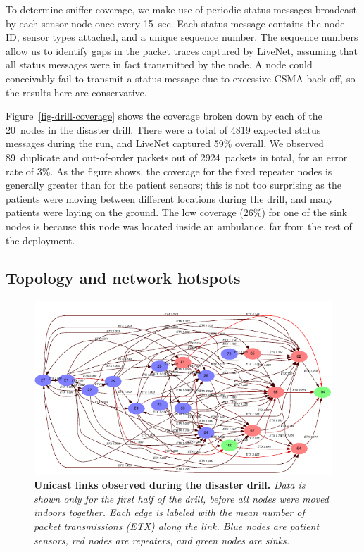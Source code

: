 To determine sniffer coverage, we make use of periodic status
messages broadcast by each sensor node once every 15~sec. Each status
message contains the node ID, sensor types attached, and a 
unique sequence number. The sequence numbers allow us to identify gaps
in the packet traces captured by LiveNet, assuming that all
status messages were in fact transmitted by the node. A node could
conceivably fail to transmit a status message due to excessive CSMA
back-off, so the results here are conservative. 

Figure~\ref{fig-drill-coverage} shows the coverage broken down by each
of the 20~nodes in the disaster drill. There were a total of 4819
expected status messages during the run, and LiveNet 
captured 59\% overall. We observed 89~duplicate and
out-of-order packets out of 2924~packets in total, for an error rate of 3\%. 
As the figure shows, the coverage for the fixed repeater nodes is
generally greater than for the patient sensors; this is not too
surprising as the patients were moving between different locations
during the drill, and many patients were laying on the ground.
The low coverage (26\%) for one of the sink nodes is because this node
was located inside an ambulance, far from the rest of the deployment.

\subsection{Topology and network hotspots}
\label{sec-livenet-topology-path}


\begin{figure}[t]
\begin{center}
\includegraphics[width=0.8\hsize]{./resources/livenet-sensys07/figs/topology/drill/topology.pdf}
\end{center}
\caption{\small {\bf Unicast links observed during the disaster drill.}
{\em Data is shown only for the first half of the drill, before all
nodes were moved indoors together. Each edge is labeled with 
the mean number of packet transmissions (ETX) along the link. 
Blue nodes are patient sensors, red nodes are repeaters, 
and green nodes are sinks.}}
\label{fig-drill-topology}
\end{figure}


